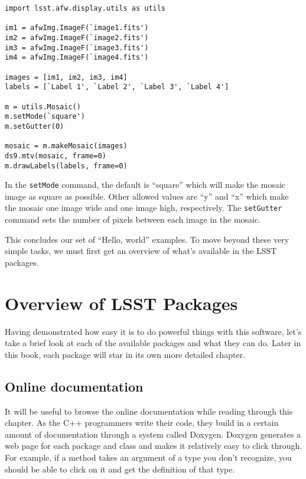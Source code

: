 \documentclass{book}
\begin{document}
\begin{verbatim}
import lsst.afw.display.utils as utils

im1 = afwImg.ImageF(`image1.fits')
im2 = afwImg.ImageF(`image2.fits')
im3 = afwImg.ImageF(`image3.fits')
im4 = afwImg.ImageF(`image4.fits')

images = [im1, im2, im3, im4]
labels = [`Label 1', `Label 2', `Label 3', `Label 4']

m = utils.Mosaic()
m.setMode(`square')
m.setGutter(0)

mosaic = m.makeMosaic(images)
ds9.mtv(mosaic, frame=0)
m.drawLabels(labels, frame=0)
\end{verbatim}

In the \texttt{setMode} command, the default is ``square'' which will
make the mosaic image as square as possible.  Other allowed values are
``y'' and ``x'' which make the mosaic one image wide and one image
high, respectively.  The \texttt{setGutter} command sets the number of
pixels between each image in the mosaic.


\vskip0.5in

This concludes our set of ``Hello, world'' examples.  To move beyond
these very simple tasks, we must first get an overview of what's
available in the LSST packages.

\chapter{Overview of LSST Packages\label{chap-overview}}

Having demonstrated how easy it is to do powerful things with this
software, let's take a brief look at each of the available packages
and what they can do.  Later in this book, each package will star in
its own more detailed chapter.

\section{Online documentation}

It will be useful to browse the online documentation while reading
through this chapter.  As the C++ programmers write their code, they
build in a certain amount of documentation through a system called
Doxygen.  Doxygen generates a web page for each package and class and
makes it relatively easy to click through.  For example, if a method
takes an argument of a type you don't recognize, you should be able to
click on it and get the definition of that type.
\end{document}
